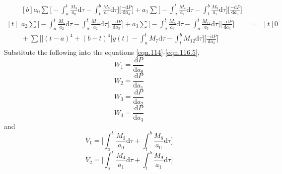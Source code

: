 \documentclass[letterpaper%
, twoside%
, 12pt%
,memoire%
, english%
,creativecommons,hyperref%
]{thETS}
\begin{document}
\begin{equation}\label{eqn.116.5}
\begin{aligned}[t]
	\begin{aligned}[b]
	a_{0} \sum \bigg[-\int_{a}^{t}\frac{M_{3}}{a_{0}}\mathrm{d}\tau-\int_{t}^{b}\frac{M_{8}}{a_{0}}\mathrm{d}\tau\bigg] \bigg[\frac{-\mathrm{d}P}{\mathrm{d}a_{3}}\bigg] + a_{1} \sum \bigg[-\int_{a}^{t}\frac{M_{4}}{a_{1}}\mathrm{d}\tau-\int_{t}^{b}\frac{M_{9}}{a_{1}}\mathrm{d}\tau\bigg] \bigg[\frac{-\mathrm{d}P}{\mathrm{d}a_{3}}\bigg] \\
	a_{2} \sum \bigg[-\int_{a}^{t}\frac{M_{5}}{a_{2}}\mathrm{d}\tau-\int_{a}^{t}\frac{M_{10}}{a_{2}}\mathrm{d}\tau\bigg] \bigg[\frac{-\mathrm{d}P}{\mathrm{d}a_{3}}\bigg] + a_{3} \sum \bigg[-\int_{a}^{t}\frac{M_{6}}{a_{3}}\mathrm{d}\tau-\int_{a}^{t}\frac{M_{11}}{a_{3}}\mathrm{d}\tau\bigg] \bigg[\frac{-\mathrm{d}P}{\mathrm{d}a_{3}}\bigg] \\ 
	{} +\sum\bigg[\big[(t-a)^4+(b-t)^4\big]y(t) -\int_{a}^{t}{M_{7}}\mathrm{d}\tau-\int_{t}^{b}{M_{12}}\mathrm{d}\tau \bigg]\bigg[\frac{-\mathrm{d}P}{\mathrm{d}a_{3}}\bigg]
	\end{aligned}
	& =
	\begin{aligned}[t]
	0
	\end{aligned}
\end{aligned}
\end{equation}
Substitute the following into the equations \eqref{eqn.114}-\eqref{eqn.116.5},
\begin{equation}\label{eqn.117}
W_{1} = \frac{\mathrm{d}P}{\mathrm{d}a_{0}}
\end{equation}
\begin{equation}\label{eqn.118}
W_{2} = \frac{\mathrm{d}P}{\mathrm{d}a_{1}}
\end{equation}
\begin{equation}\label{eqn.119}
W_{3} = \frac{\mathrm{d}P}{\mathrm{d}a_{2}}
\end{equation}
\begin{equation}\label{eqn.119.5}
W_{4} = \frac{\mathrm{d}P}{\mathrm{d}a_{3}}
\end{equation}
and
\begin{equation}\label{eqn.120}
V_{1} = \bigg[\int_{a}^{t}\frac{M_{3}}{a_{0}} \mathrm{d}\tau + \int_{t}^{b}\frac{M_{8}}{a_{0}} \mathrm{d}\tau \bigg]
\end{equation}
\begin{equation}\label{eqn.121}
V_{2} = \bigg[\int_{a}^{t}\frac{M_{4}}{a_{1}} \mathrm{d}\tau + \int_{t}^{b}\frac{M_{9}}{a_{1}} \mathrm{d}\tau \bigg]
\end{equation}
\end{document}
